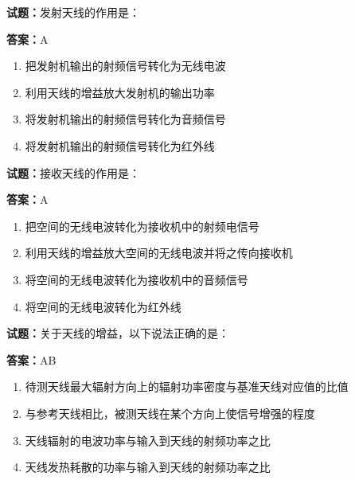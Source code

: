 \documentclass{ctexbook}
\begin{document}



\vspace{1em}

\textbf{试题：}发射天线的作用是： 

\textbf{答案：}A 

\begin{enumerate}[leftmargin=3em]
  \item 把发射机输出的射频信号转化为无线电波 

  \item 利用天线的增益放大发射机的输出功率 

  \item 将发射机输出的射频信号转化为音频信号 

  \item 将发射机输出的射频信号转化为红外线 

\end{enumerate}





\vspace{1em}

\textbf{试题：}接收天线的作用是： 

\textbf{答案：}A 

\begin{enumerate}[leftmargin=3em]
  \item 把空间的无线电波转化为接收机中的射频电信号 

  \item 利用天线的增益放大空间的无线电波并将之传向接收机 

  \item 将空间的无线电波转化为接收机中的音频信号 

  \item 将空间的无线电波转化为红外线 

\end{enumerate}






\vspace{1em}

\textbf{试题：}关于天线的增益，以下说法正确的是： 

\textbf{答案：}AB 

\begin{enumerate}[leftmargin=3em]
  \item 待测天线最大辐射方向上的辐射功率密度与基准天线对应值的比值 

  \item 与参考天线相比，被测天线在某个方向上使信号增强的程度 

  \item 天线辐射的电波功率与输入到天线的射频功率之比 

  \item 天线发热耗散的功率与输入到天线的射频功率之比 

\end{enumerate}
\end{document}
